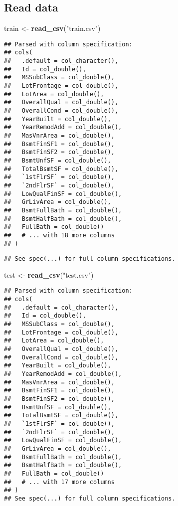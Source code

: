 \documentclass[
]{article}
\newenvironment{Shaded}{\begin{snugshade}}{\end{snugshade}}
\newcommand{\KeywordTok}[1]{\textcolor[rgb]{0.13,0.29,0.53}{\textbf{#1}}}
\newcommand{\NormalTok}[1]{#1}
\newcommand{\StringTok}[1]{\textcolor[rgb]{0.31,0.60,0.02}{#1}}
\begin{document}
\hypertarget{read-data}{%
\subsection{Read data}\label{read-data}}

\begin{Shaded}
\begin{Highlighting}[]
\NormalTok{train <-}\StringTok{ }\KeywordTok{read_csv}\NormalTok{(}\StringTok{"train.csv"}\NormalTok{)}
\end{Highlighting}
\end{Shaded}

\begin{verbatim}
## Parsed with column specification:
## cols(
##   .default = col_character(),
##   Id = col_double(),
##   MSSubClass = col_double(),
##   LotFrontage = col_double(),
##   LotArea = col_double(),
##   OverallQual = col_double(),
##   OverallCond = col_double(),
##   YearBuilt = col_double(),
##   YearRemodAdd = col_double(),
##   MasVnrArea = col_double(),
##   BsmtFinSF1 = col_double(),
##   BsmtFinSF2 = col_double(),
##   BsmtUnfSF = col_double(),
##   TotalBsmtSF = col_double(),
##   `1stFlrSF` = col_double(),
##   `2ndFlrSF` = col_double(),
##   LowQualFinSF = col_double(),
##   GrLivArea = col_double(),
##   BsmtFullBath = col_double(),
##   BsmtHalfBath = col_double(),
##   FullBath = col_double()
##   # ... with 18 more columns
## )
\end{verbatim}

\begin{verbatim}
## See spec(...) for full column specifications.
\end{verbatim}

\begin{Shaded}
\begin{Highlighting}[]
\NormalTok{test <-}\StringTok{ }\KeywordTok{read_csv}\NormalTok{(}\StringTok{"test.csv"}\NormalTok{)}
\end{Highlighting}
\end{Shaded}

\begin{verbatim}
## Parsed with column specification:
## cols(
##   .default = col_character(),
##   Id = col_double(),
##   MSSubClass = col_double(),
##   LotFrontage = col_double(),
##   LotArea = col_double(),
##   OverallQual = col_double(),
##   OverallCond = col_double(),
##   YearBuilt = col_double(),
##   YearRemodAdd = col_double(),
##   MasVnrArea = col_double(),
##   BsmtFinSF1 = col_double(),
##   BsmtFinSF2 = col_double(),
##   BsmtUnfSF = col_double(),
##   TotalBsmtSF = col_double(),
##   `1stFlrSF` = col_double(),
##   `2ndFlrSF` = col_double(),
##   LowQualFinSF = col_double(),
##   GrLivArea = col_double(),
##   BsmtFullBath = col_double(),
##   BsmtHalfBath = col_double(),
##   FullBath = col_double()
##   # ... with 17 more columns
## )
## See spec(...) for full column specifications.
\end{verbatim}
\end{document}
